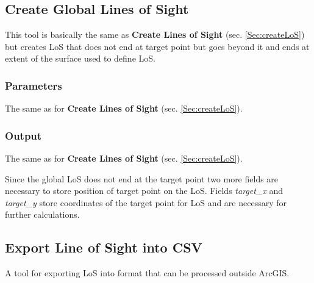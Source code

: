 \documentclass[]{article}
\begin{document}
\subsection{Create Global Lines of Sight}

This tool is basically the same as \textbf{Create Lines of Sight} (sec. \ref{Sec:createLoS}) but creates LoS that does not end at target point but goes beyond it and ends at extent of the surface used to define LoS.

\subsubsection{Parameters}
The same as for \textbf{Create Lines of Sight} (sec. \ref{Sec:createLoS}).

\subsubsection{Output}

The same as for \textbf{Create Lines of Sight} (sec. \ref{Sec:createLoS}).

Since the global LoS does not end at the target point two more fields are necessary to store position of target point on the LoS. Fields \textit{target\_x} and \textit{target\_y} store coordinates of the target point for LoS and are necessary for further calculations.


\subsection{Export Line of Sight into CSV}

A tool for exporting LoS into format that can be processed outside ArcGIS.
\end{document}
